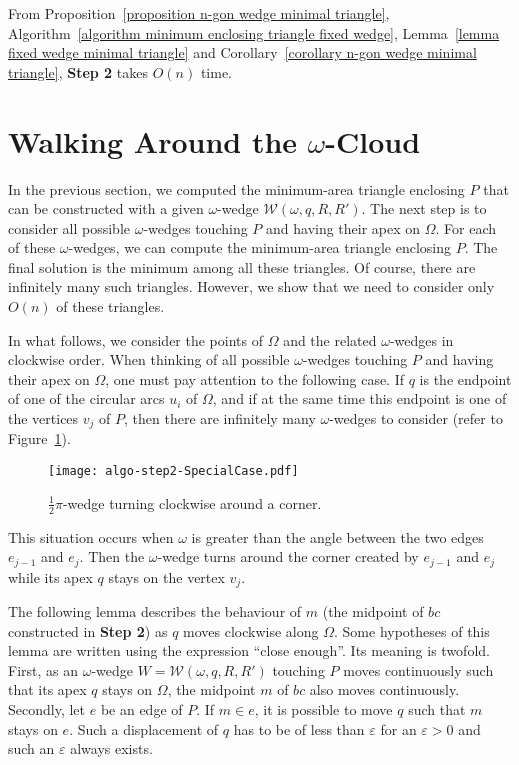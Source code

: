 \documentclass[11pt, oneside]{article}
\def\wedge{\mathcal{W}}
\begin{document}
From Proposition~\ref{proposition n-gon wedge minimal triangle},
Algorithm~\ref{algorithm minimum enclosing triangle fixed wedge},
Lemma~\ref{lemma fixed wedge minimal triangle}
and Corollary~\ref{corollary n-gon wedge minimal triangle},
{\bf Step 2} takes $O(n)$ time.




\section{Walking Around the $\omega$-Cloud}
\label{section walking around omega cloud}




In the previous section,
we computed the minimum-area triangle
enclosing $P$
that can be constructed with a given $\omega$-wedge
$\wedge(\omega,q,R,R')$.
The next step is to consider
all possible $\omega$-wedges touching $P$
and having their apex on $\Omega$.
For each of these $\omega$-wedges,
we can compute the minimum-area triangle enclosing $P$.
The final solution is the minimum among all these triangles.
Of course,
there are infinitely many such triangles.
However,
we show that we need to consider 
only $O(n)$ of these triangles.

In what follows,
we consider the points of $\Omega$ 
and the related $\omega$-wedges
in clockwise order.
When thinking of all possible $\omega$-wedges touching $P$
and having their apex on $\Omega$,
one must pay attention to the following case.
If $q$ is the endpoint of one of the circular arcs $u_i$ of $\Omega$,
and if at the same time this endpoint is one of the vertices $v_j$ of $P$,
then there are infinitely many $\omega$-wedges to consider
(refer to Figure~\ref{fig algo-step2-SpecialCase}).
\begin{figure}
\centering
\texttt{[image: algo-step2-SpecialCase.pdf]}
\caption{$\frac{1}{2}\pi$-wedge turning clockwise around a corner.\label{fig algo-step2-SpecialCase}}
\end{figure}
This situation occurs when $\omega$ is greater 
than the angle between the two edges $e_{j-1}$ and $e_j$.
Then the $\omega$-wedge turns
around the corner created by $e_{j-1}$ and $e_j$
while its apex $q$ stays on the vertex $v_j$.

The following lemma
describes the behaviour of $m$
(the midpoint of $bc$ constructed in {\bf Step 2})
as $q$ moves clockwise along $\Omega$.
Some hypotheses of this lemma
are written using the expression ``close enough''.
Its meaning is twofold.
First,
as an $\omega$-wedge $W=\wedge(\omega,q,R,R')$ touching $P$
moves continuously
such that its apex $q$ stays on $\Omega$,
the midpoint $m$ of $bc$ 
also moves continuously.
Secondly,
let $e$ be an edge of $P$.
If $m\in e$,
it is possible to move $q$ 
such that $m$ stays on $e$.
Such a displacement of $q$ has to be 
of less than $\varepsilon$ for an $\varepsilon>0$
and such an $\varepsilon$ always exists.
\end{document}
